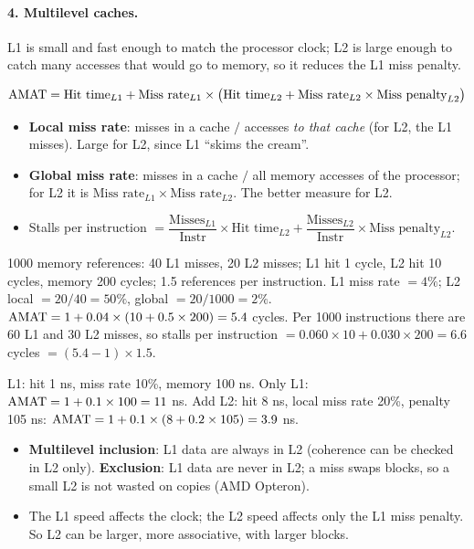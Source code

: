 \paragraph{4. Multilevel caches.} L1 is small and fast enough to match the
processor clock; L2 is large enough to catch many accesses that would go to
memory, so it reduces the L1 miss penalty.
\begin{theorem}
\[
  \mathrm{AMAT}=\text{Hit time}_{L1}+\text{Miss rate}_{L1}\times
  \big(\text{Hit time}_{L2}+\text{Miss rate}_{L2}\times\text{Miss penalty}_{L2}\big)
\]
\begin{itemize}
  \item \textbf{Local miss rate}: misses in a cache $/$ accesses \emph{to that
  cache} (for L2, the L1 misses). Large for L2, since L1 ``skims the cream''.
  \item \textbf{Global miss rate}: misses in a cache $/$ all memory accesses of the
  processor; for L2 it is $\text{Miss rate}_{L1}\times\text{Miss rate}_{L2}$. The
  better measure for L2.
  \item Stalls per instruction $=\dfrac{\text{Misses}_{L1}}{\text{Instr}}\times\text{Hit time}_{L2}
  +\dfrac{\text{Misses}_{L2}}{\text{Instr}}\times\text{Miss penalty}_{L2}$.
\end{itemize}
\end{theorem}

\begin{eg}
1000 memory references: 40 L1 misses, 20 L2 misses; L1 hit 1 cycle, L2 hit 10
cycles, memory 200 cycles; 1.5 references per instruction. L1 miss rate $=4\%$;
L2 local $=20/40=50\%$, global $=20/1000=2\%$.
$\mathrm{AMAT}=1+0.04\times(10+0.5\times200)=5.4$ cycles. Per 1000 instructions there are
60 L1 and 30 L2 misses, so stalls per instruction
$=0.060\times10+0.030\times200=6.6$ cycles $=(5.4-1)\times1.5$.
\end{eg}

\begin{eg}
L1: hit 1 ns, miss rate 10\%, memory 100 ns. Only L1: $\mathrm{AMAT}=1+0.1\times100=11$ ns.
Add L2: hit 8 ns, local miss rate 20\%, penalty 105 ns:
$\mathrm{AMAT}=1+0.1\times(8+0.2\times105)=3.9$ ns.
\end{eg}

\begin{itemize}
  \item \textbf{Multilevel inclusion}: L1 data are always in L2 (coherence can be
  checked in L2 only). \textbf{Exclusion}: L1 data are never in L2; a miss swaps
  blocks, so a small L2 is not wasted on copies (AMD Opteron).
  \item The L1 speed affects the clock; the L2 speed affects only the L1 miss
  penalty. So L2 can be larger, more associative, with larger blocks.
\end{itemize}

